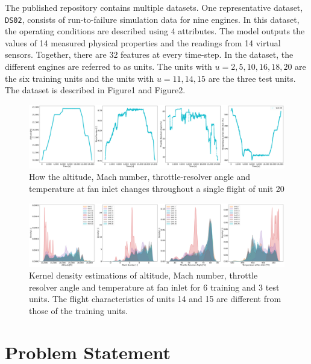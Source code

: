 \documentclass[a4paper,12pt]{article}
\begin{document}
The published repository contains multiple datasets. One representative dataset,
\texttt{DS02}, consists of run-to-failure simulation data for nine engines.
In this dataset, the operating conditions are described using 4 attributes.
The model outputs the values of 14 measured physical properties and the
readings from 14 virtual sensors. Together, there are 32 features at every
time-step. In the dataset, the different engines are referred to as units. The
units with $u = 2, 5, 10, 16, 18, 20$ are the six training units and the units
with $u = 11, 14, 15$ are the three test units. The dataset is described in Figure1 and Figure2.

\begin{figure}
    \centering
    \includegraphics[width=\linewidth]{flight_profile.png}
    \caption{How the altitude, Mach number, throttle-resolver angle and temperature at fan inlet changes throughout a single flight of unit 20}
    \label{fig:flight_profile}
\end{figure}


\begin{figure}
    \centering
    \includegraphics[width=\linewidth]{kde.png}
    \caption{Kernel density estimations of altitude, Mach number, throttle resolver angle and temperature at fan inlet for 6 training and 3 test units. The flight characteristics of units 14 and 15 are different from those of the training units.}
    \label{fig:unit_kde}
\end{figure}


\section{Problem Statement}
\end{document}
